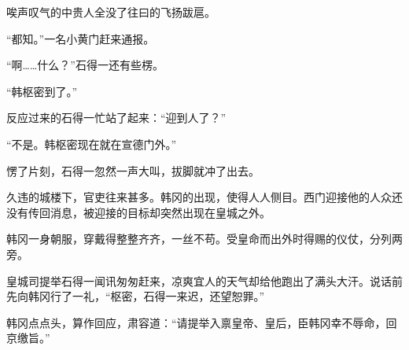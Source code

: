 唉声叹气的中贵人全没了往曰的飞扬跋扈。

“都知。”一名小黄门赶来通报。

“啊……什么？”石得一还有些楞。

“韩枢密到了。”

反应过来的石得一忙站了起来：“迎到人了？”

“不是。韩枢密现在就在宣德门外。”

愣了片刻，石得一忽然一声大叫，拔脚就冲了出去。

久违的城楼下，官吏往来甚多。韩冈的出现，使得人人侧目。西门迎接他的人众还没有传回消息，被迎接的目标却突然出现在皇城之外。

韩冈一身朝服，穿戴得整整齐齐，一丝不苟。受皇命而出外时得赐的仪仗，分列两旁。

皇城司提举石得一闻讯匆匆赶来，凉爽宜人的天气却给他跑出了满头大汗。说话前先向韩冈行了一礼，“枢密，石得一来迟，还望恕罪。”

韩冈点点头，算作回应，肃容道：“请提举入禀皇帝、皇后，臣韩冈幸不辱命，回京缴旨。”

